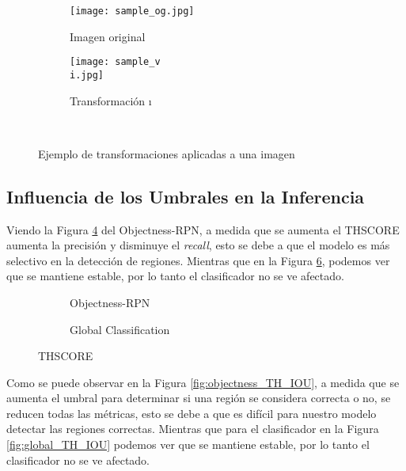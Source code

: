 \begin{figure}[h]
  \centering
  \begin{subfigure}{.3\textwidth}
    \texttt{[image: sample\_og.jpg]}
    \caption{Imagen original}
    \label{fig:sample_og}
  \end{subfigure}
   {
    \begin{subfigure}{.3\textwidth}
      \texttt{[image: sample\_v\\i.jpg]}
      \caption{Transformación \i}
      \label{fig:sample_\i}
    \end{subfigure}
      {\\\medskip}  %
      {}
  }
  \caption{Ejemplo de transformaciones aplicadas a una imagen}
  \label{fig:data_aug}
\end{figure}


\subsection{Influencia de los Umbrales en la Inferencia}
Viendo la Figura \ref{fig:objectness_TH_SCORE} del Objectness-RPN, a medida que se aumenta el TH\textunderscore SCORE aumenta la precisión y disminuye el \textit{recall}, esto se debe a que el modelo es más selectivo en la detección de regiones. Mientras que en la Figura \ref{fig:global_TH_SCORE}, podemos ver que se mantiene estable, por lo tanto el clasificador no se ve afectado.

\begin{figure}[h]
  \centering
  \begin{subfigure}[t]{.5\textwidth}
    
    \caption{Objectness-RPN}
    \label{fig:objectness_TH_SCORE}
  \end{subfigure}%
  \begin{subfigure}[t]{.5\textwidth}
    
    \caption{Global Classification}
    \label{fig:global_TH_SCORE}
  \end{subfigure}
  \caption{TH\textunderscore SCORE}
\end{figure}

Como se puede observar en la Figura \ref{fig:objectness_TH_IOU}, a medida que se aumenta el umbral para determinar si una región se considera correcta o no, se reducen todas las métricas, esto se debe a que es difícil para nuestro modelo detectar las regiones correctas. Mientras que para el clasificador en la Figura \ref{fig:global_TH_IOU} podemos ver que se mantiene estable, por lo tanto el clasificador no se ve afectado.

